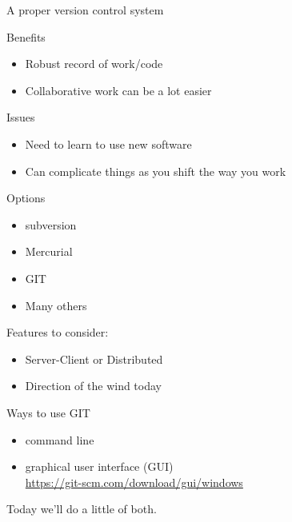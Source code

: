 \begin{frame}{A proper version control system}
  
  \begin{block}{Benefits}
    \begin{itemize}
    \item Robust record of work/code
    \item Collaborative work can be a lot easier
    \end{itemize}
  \end{block}

  \begin{block}{Issues}
    \begin{itemize}
    \item Need to learn to use new software
    \item Can complicate things as you shift the way you work
    \end{itemize}
  \end{block}

\end{frame}


\begin{frame}{Options}
  
  \begin{itemize}
  \item subversion
  \item Mercurial
  \item GIT
  \item Many others
  \end{itemize}

  Features to consider:
  \begin{itemize}
  \item Server-Client or Distributed
  \item Direction of the wind today
  \end{itemize}

\end{frame}


\begin{frame}{Ways to use GIT}
  
  \begin{itemize}
  \item command line
  \item graphical user interface (GUI)\\\url{https://git-scm.com/download/gui/windows}
  \end{itemize}

  Today we'll do a little of both.


\end{frame}


